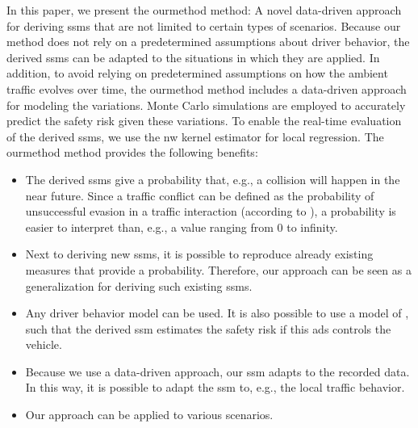 \cstarta In this paper, we present the \ac{ourmethod} method: A novel data-driven approach for deriving \acp{ssm} that are not limited to certain types of scenarios.
Because our method does not rely on a predetermined \cenda\cstartb assumptions about driver behavior\cendb\cstarta, the derived \acp{ssm} can be adapted to the situations in which they are applied. 
In addition, to avoid relying on predetermined assumptions on how the ambient traffic evolves over time, the \ac{ourmethod} method includes a data-driven approach for modeling the variations. 
Monte Carlo simulations are employed to accurately predict the safety risk given these variations.
To enable the real-time evaluation of the derived \acp{ssm}, we use the \ac{nw} kernel estimator \autocite{wasserman2006nonparametric} for local regression.
The \ac{ourmethod} method provides the following benefits: \cenda
\begin{itemize}
	\item The derived \acp{ssm} give a probability that, e.g., a collision will happen in the near future. 
	\cstartb Since a traffic conflict can be defined as the probability of unsuccessful evasion in a traffic interaction (according to \textcite{davis2011outline}), a probability is easier to interpret than, e.g., a value ranging from 0 to infinity. \cendb
	
	\item \cstarta Next to deriving new \acp{ssm}, \cenda it is possible to reproduce already existing measures that provide a probability. 
	Therefore, our approach can be seen as a generalization for deriving such existing \acp{ssm}.
	
	\item Any driver behavior model can be used.
	It is also possible to use a model of , such that the derived \ac{ssm} estimates the safety risk if this \ac{ads} controls the vehicle.
	
	\item Because we use a data-driven approach, our \ac{ssm} adapts to the recorded data. 
	In this way, it is possible to \cstarta adapt the \ac{ssm} to, e.g., the local traffic behavior\cenda.
	
	\item Our approach can be applied to various scenarios.
\end{itemize}

